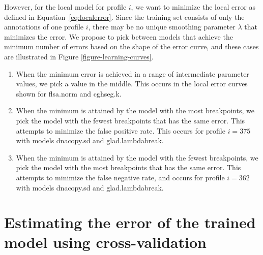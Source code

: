 \documentclass{bioinfo}
\newcommand{\model}[1]{#1}
\begin{document}
\begin{methods}
However, for the local model for profile $i$, we want to minimize the
local error as defined in Equation~\ref{eq:localerror}. Since the
training set consists of only the annotations of one profile $i$,
there may be no unique smoothing parameter $\lambda$ that minimizes
the error.
\label{pick} We propose to pick between models that achieve the
minimum number of errors based on the shape of the error curve,
and these cases are illustrated in Figure
\ref{figure-learning-curves}.
\begin{enumerate}
\item When the minimum error is achieved in a range of intermediate
  parameter values, we pick a value in the middle. This occurs in the
  local error curves shown for \model{flsa.norm} and
  \model{cghseg.k}.
\item When the minimum is attained by the model with the most
  breakpoints, we pick the model with the fewest breakpoints that has
  the same error. This attempts to minimize the false positive
  rate. This occurs for profile $i=375$ with models
  \model{dnacopy.sd} and \model{glad.lambdabreak}.
\item When the minimum is attained by the model with the fewest
  breakpoints, we pick the model with the most breakpoints that has
  the same error. This attempts to minimize the false negative rate,
  and occurs for profile $i=362$ with models
  \model{dnacopy.sd} and \model{glad.lambdabreak}.
\end{enumerate}



\section{Estimating the error of the trained model using
  cross-validation}\label{crossvalidation}


\end{methods}
\end{document}
